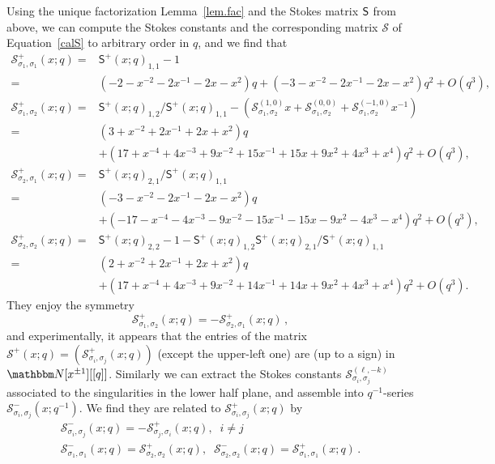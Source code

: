 \documentclass[12pt,reqno]{amsart}
\theoremstyle{definition}
\def\BN{\mathbbm N}
\def\calS{\mathcal S}
\def\s{\sigma}
\def\mc{\mathcal}
\def\ms{\mathsf}
\def\cO{O}
\newcommand{\nn}{\nonumber \\}
\begin{document}
Using the unique factorization Lemma~\ref{lem.fac} and the Stokes
matrix $\sf{S}$ from above, we can compute the Stokes constants and
the corresponding matrix $\calS$ of Equation~\eqref{calS} to arbitrary
order in $q$, and we find that
\begin{align}
  \mc{S}^+_{\s_1,\s_1}(x;q) =
  &\ms{S}^+(x;q)_{1,1}-1\nn=
  &(-2 - x^{-2} - 2x^{-1} - 2 x - x^2)q
    +(-3 - x^{-2} - 2x^{-1} - 2 x - x^2)q^2+\cO(q^3),\\
  \mc{S}^+_{\s_1,\s_2}(x;q) =
  &\ms{S}^+(x;q)_{1,2}/\ms{S}^+(x;q)_{1,1}
  -(\mc{S}^{(1,0)}_{\s_1,\s_2}x+\mc{S}^{(0,0)}_{\s_1,\s_2}
  +\mc{S}^{(-1,0)}_{\s_1,\s_2}x^{-1})\nn=
  &(3 + x^{-2} + 2x^{-1} + 2 x + x^2)q\nn
  &+(17 + x^{-4} + 4x^{-3} + 9x^{-2} + 15x^{-1} + 15 x + 9 x^2 + 4 x^3 + x^4)
  q^2+\cO(q^3),\\
  \mc{S}^+_{\s_2,\s_1}(x;q) =
  &\ms{S}^+(x;q)_{2,1}/\ms{S}^+(x;q)_{1,1}\nn=
  &(-3 - x^{-2} - 2x^{-1} - 2 x - x^2)q\nn
  &+(-17 - x^{-4} - 4x^{-3} - 9x^{-2} - 15 x^{-1} - 15 x - 9 x^2 - 4 x^3 - x^4)
  q^2+\cO(q^3),\\
  \mc{S}^+_{\s_2,\s_2}(x;q) =
  &\ms{S}^+(x;q)_{2,2} -1-
    \ms{S}^+(x;q)_{1,2}\ms{S}^+(x;q)_{2,1}/\ms{S}^+(x;q)_{1,1}\nn=
  &(2 + x^{-2} + 2x^{-1} + 2 x + x^2) q \nn
  &+ (17 + x^{-4} + 4x^{-3} + 9x^{-2} + 14x^{-1} + 14 x + 9 x^2 + 4 x^3 + x^4)
  q^2+\cO(q^3).
\end{align}
They enjoy the symmetry
\begin{equation}
  \mc{S}^{+}_{\s_1,\s_2}(x;q) =
  -\mc{S}^{+}_{\s_2,\s_1}(x;q)\,,
\end{equation}
and experimentally, it appears that the entries of the matrix
$\mc{S}^+(x;q) = (\mc{S}^+_{\s_i,\s_j}(x;q))$ (except the upper-left
one) are (up to a sign) in $\BN[x^{\pm 1}][[q]]$. 
Similarly we can extract the Stokes constants
$\mc{S}^{(\ell,-k)}_{\s_i,\s_j}$ associated to the singularities in
the lower half plane, and assemble into $q^{-1}$-series
$\mc{S}^{-}_{\s_i,\s_j}(x;q^{-1})$.  We find they are related to
$\mc{S}^+_{\s_i,\s_j}(x;q)$ by
\begin{gather}
  \mc{S}^{-}_{\s_i,\s_j}(x;q) = -\mc{S}^{+}_{\s_j,\s_i}(x;q),\;\;i\neq j\,
  \nn
  \mc{S}^{-}_{\s_1,\s_1}(x;q) = \mc{S}^{+}_{\s_2,\s_2}(x;q),\;\;
  \mc{S}^{-}_{\s_2,\s_2}(x;q) = \mc{S}^{+}_{\s_1,\s_1}(x;q)\,.
\end{gather}
\end{document}

